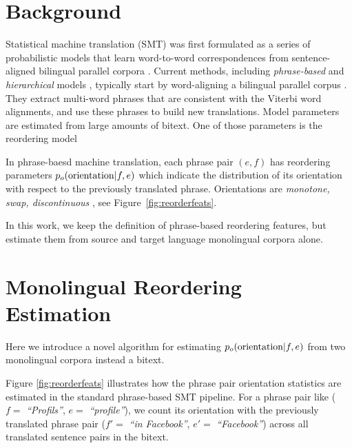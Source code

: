 \documentclass[11pt,letterpaper]{article}
\newcommand{\mnote}[1]{\marginpar{%
  \vskip-\baselineskip
  \raggedright\footnotesize
  \itshape\hrule\smallskip\tiny{#1}\par\smallskip\hrule}}
\newcommand{\mtodo}[1]{\mnote{\textcolor{red}{#1}}}
\newcommand{\figref}[1]{Figure~\ref{#1}}
\newcommand{\emq}[1]{\emph{``#1''}}
\begin{document}
\section{Background} \label{sect:bckg}


Statistical machine translation (SMT) was first formulated as a series of probabilistic models that learn word-to-word correspondences from sentence-aligned bilingual parallel corpora \cite{Brown:1993}.  \nocite{Brown1988}
%
Current methods, including {\em phrase-based} \cite{Och:2002,Koehn:2003} and {\em hierarchical} models \cite{Chiang:2005}, typically start by word-aligning a bilingual parallel corpus \cite{Och2003}.  They extract multi-word phrases that are consistent with the Viterbi word alignments, and use these phrases to build new translations.  Model parameters are estimated from large amounts of bitext.  One of those parameters is the reordering model

In phrase-baesd machine translation, each phrase pair $(e, f)$ has reordering parameters $p_o(\textnormal{orientation}|f,e)$ which indicate the distribution of its orientation with respect to the previously translated phrase. Orientations are {\it monotone, swap, discontinuous} \cite{tillman:2004:HLTNAACL,Kumar2004,Koehn-EtAl:2005:IWSLT}, see \figref{fig:reorderfeats}. 

In this work, we keep the definition of phrase-based reordering features, but estimate them from source and target language monolingual corpora alone. %



\section{Monolingual Reordering Estimation} \label{sect:order}

Here we introduce a novel algorithm for estimating $p_o(\textnormal{orientation}|f,e)$ from two monolingual corpora instead a bitext.

Figure \ref{fig:reorderfeats} illustrates how the phrase pair orientation statistics are estimated in the standard phrase-based SMT pipeline.  For a phrase pair like ($f =$ \emq{Profils}, $e =$ \emq{profile}), we count its orientation with the previously translated phrase pair ($f' =$ \emq{in Facebook}, $e' =$ \emq{Facebook}) across all translated sentence pairs in the bitext.  
\end{document}
